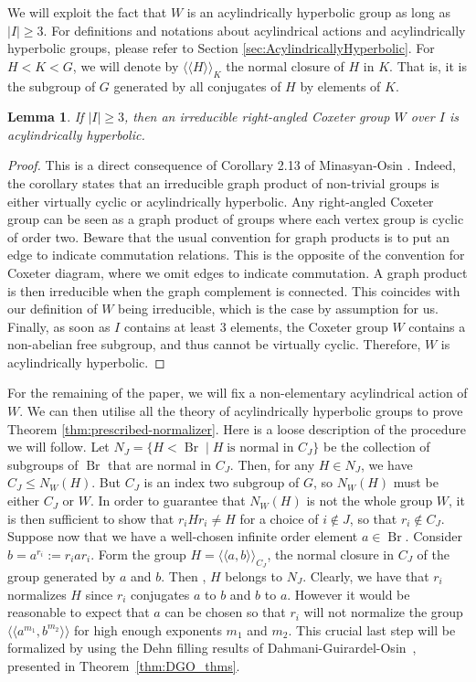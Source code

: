 \documentclass[10pt,a4paper]{amsart}
\newtheorem{lemma}[prop]{Lemma}
\newcommand{\Br}{\operatorname{Br}}
\begin{document}
We will exploit the fact that $W$ is an acylindrically hyperbolic group as long as $|I| \geq 3$. For definitions and notations about acylindrical actions and acylindrically hyperbolic groups, please refer to Section \ref{sec:AcylindricallyHyperbolic}. For $H < K < G$, we will denote by $\langle\langle H \rangle\rangle_K$ the normal closure of $H$ in $K$. That is, it is the subgroup of $G$ generated by all conjugates of $H$ by elements of $K$.


\begin{lemma}
    If $|I| \geq 3$, then an irreducible right-angled Coxeter group $W$ over $I$ is acylindrically hyperbolic.
\end{lemma}
\begin{proof}
This is a direct consequence of Corollary 2.13 of Minasyan-Osin \cite{minasyan2013acylindrically}. Indeed, the corollary states that an irreducible graph product of non-trivial groups is either virtually cyclic or acylindrically hyperbolic. Any right-angled Coxeter group can be seen as a graph product of groups where each vertex group is cyclic of order two. Beware that the usual convention for graph products is to put an edge to indicate commutation relations. This is the opposite of the convention for Coxeter diagram, where we omit edges to indicate commutation. A graph product is then irreducible when the graph complement is connected. This coincides with our definition of $W$ being irreducible, which is the case by assumption for us. Finally, as soon as $I$ contains at least $3$ elements, the Coxeter group $W$ contains a non-abelian free subgroup, and thus cannot be virtually cyclic. Therefore, $W$ is acylindrically hyperbolic.
\end{proof}

For the remaining of the paper, we will fix a non-elementary acylindrical action of $W$.
We can then utilise all the theory of acylindrically hyperbolic groups to prove Theorem \ref{thm:prescribed-normalizer}. Here is a loose description of the procedure we will follow. Let $N_J = \{H < \Br \mid H \; \text{is normal in } C_J\}$ be the collection of subgroups of $\Br$ that are normal in $C_J$. Then, for any $H \in N_J$, we have $C_J \leq N_W(H)$. But $C_J$ is an index two subgroup of $G$, so $N_W(H)$ must be either $C_J$ or $W$. In order to guarantee that $N_W(H)$ is not the whole group $W$, it is then sufficient to show that $r_i H r_i \neq H$ for a choice of $i \notin J$, so that $r_i \notin C_J$. Suppose now that we have a well-chosen infinite order element $a \in \Br$. Consider $b = a^{r_i} := r_i a r_i$. Form the group $ H =\langle\langle a,b\rangle \rangle_{C_J}$, the normal closure in $C_J$ of the group generated by $a$ and $b$. Then , $H$ belongs to $N_J$. Clearly, we have that $r_i$ normalizes $H$ since $r_i$ conjugates $a$ to $b$ and $b$ to $a$. However it would be reasonable to expect that $a$ can be chosen so that $r_i$ will not normalize the group $\langle \langle a^{m_1}, b^{m_2}\rangle \rangle$ for high enough exponents $m_1$ and $m_2$. This crucial last step will be formalized by using the Dehn filling results of Dahmani-Guirardel-Osin~\cite[Theorem 7.19]{DGO}, presented in Theorem~\ref{thm:DGO_thms}.
\end{document}

